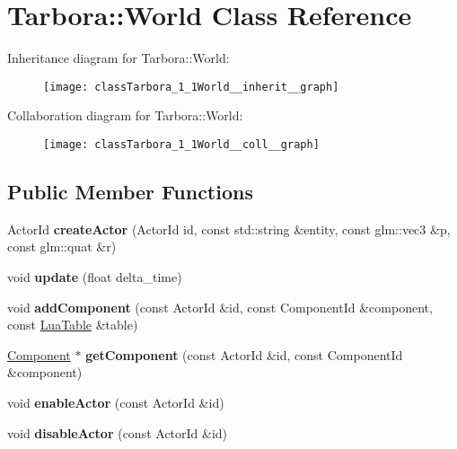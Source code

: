 \hypertarget{classTarbora_1_1World}{}\section{Tarbora\+:\+:World Class Reference}
\label{classTarbora_1_1World}


Inheritance diagram for Tarbora\+:\+:World\+:
\nopagebreak
\begin{figure}[H]
\begin{center}
\leavevmode
\texttt{[image: classTarbora\_1\_1World\_\_inherit\_\_graph]}
\end{center}
\end{figure}


Collaboration diagram for Tarbora\+:\+:World\+:
\nopagebreak
\begin{figure}[H]
\begin{center}
\leavevmode
\texttt{[image: classTarbora\_1\_1World\_\_coll\_\_graph]}
\end{center}
\end{figure}
\subsection*{Public Member Functions}
\begin{DoxyCompactItemize}
\item 
\mbox{\label{classTarbora_1_1World_a9e7b76d9d1230f131996664fc2348b99}} 
Actor\+Id {\bfseries create\+Actor} (Actor\+Id id, const std\+::string \&entity, const glm\+::vec3 \&p, const glm\+::quat \&r)
\item 
\mbox{\label{classTarbora_1_1World_a64569055001d1cd3d68c74d540c18a60}} 
void {\bfseries update} (float delta\+\_\+time)
\item 
\mbox{\label{classTarbora_1_1World_af72495b62c28dfb15998b9168da574d1}} 
void {\bfseries add\+Component} (const Actor\+Id \&id, const Component\+Id \&component, const \hyperlink{classTarbora_1_1LuaTable}{Lua\+Table} \&table)
\item 
\mbox{\label{classTarbora_1_1World_a990fd3df957540927273d790cb6b0ffe}} 
\hyperlink{classTarbora_1_1Component}{Component} $\ast$ {\bfseries get\+Component} (const Actor\+Id \&id, const Component\+Id \&component)
\item 
\mbox{\label{classTarbora_1_1World_a389d4d1710a730cf774f3eb1e7f7b8a0}} 
void {\bfseries enable\+Actor} (const Actor\+Id \&id)
\item 
\mbox{\label{classTarbora_1_1World_ad353ce0e49bc3ed9b7fe62580e95ca59}} 
void {\bfseries disable\+Actor} (const Actor\+Id \&id)
\end{DoxyCompactItemize}
